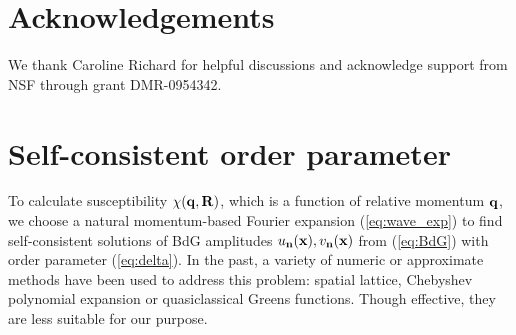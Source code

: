 \documentclass[prb,aps,showpacs,amsmath,twocolumn,10pt]{revtex4-1}
\begin{document}

\section{Acknowledgements}

We thank Caroline Richard for helpful discussions and 
acknowledge support from NSF through grant DMR-0954342. 



\appendix*

\section{Self-consistent order parameter}
\label{app:self-cons}

To calculate susceptibility $\chi({\bf q},{\bf R})$, which is a function
of relative momentum ${\bf q}$, we choose a natural momentum-based Fourier
expansion (\ref{eq:wave_exp}) to find 
self-consistent solutions of BdG amplitudes $u_{\bf n}({\bf x}),v_{\bf n}({\bf x})$ from (\ref{eq:BdG}) with order parameter
(\ref{eq:delta}). 
In the past, a variety of numeric or approximate
methods have been used to address this problem: 
\cite{Vorontsov2005fflo, PhysRevLett.80.4763, RevModPhys.76.263, RevModPhys.77.935,
JPSJ.68.3120, PhysRevB.57.8709, PhysRevLett.110.131601} 
spatial lattice,\cite{Marcin2009}
Chebyshev polynomial expansion\cite{PhysRevLett.105.167006} or
quasiclassical Greens functions.\cite{Burkhardt1994} 
Though effective, they are less suitable for our purpose.
\end{document}
